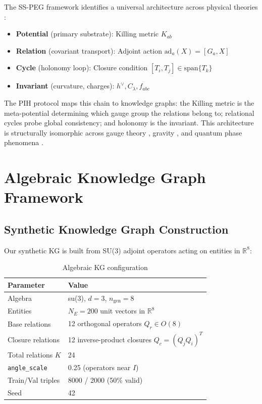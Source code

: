 \documentclass[11pt,letterpaper]{article}
\newcommand{\ad}{\text{ad}}
\newcommand{\hvee}{h^\vee}
\begin{document}
The SS-PEG framework identifies a universal architecture across physical theories \cite{sspeg_synthesis2026}:
\begin{itemize}[noitemsep]
\item \textbf{Potential} (primary substrate): Killing metric $K_{ab}$
\item \textbf{Relation} (covariant transport): Adjoint action $\ad_a(X) = [G_a, X]$
\item \textbf{Cycle} (holonomy loop): Closure condition $[T_i, T_j] \in \text{span}\{T_k\}$
\item \textbf{Invariant} (curvature, charges): $\hvee, C_\lambda, f_{abc}$
\end{itemize}
The PIH protocol maps this chain to knowledge graphs: the Killing metric is the meta-potential determining which gauge group the relations belong to; relational cycles probe global consistency; and holonomy is the invariant. This architecture is structurally isomorphic across gauge theory \cite{yang1954, georgi1982}, gravity \cite{jacobson1995, helgason2001}, and quantum phase phenomena \cite{aharonov1959, berry1984, fulton1991}.

\section{Algebraic Knowledge Graph Framework}

\subsection{Synthetic Knowledge Graph Construction}

Our synthetic KG is built from SU(3) adjoint operators acting on entities in $\mathbb{R}^8$:

\begin{table}[H]
\centering
\caption{Algebraic KG configuration}
\begin{tabular}{@{}ll@{}}
\toprule
\textbf{Parameter} & \textbf{Value} \\
\midrule
Algebra & su(3), $d=3$, $n_{\text{gen}} = 8$ \\
Entities & $N_E = 200$ unit vectors in $\mathbb{R}^8$ \\
Base relations & 12 orthogonal operators $Q_r \in O(8)$ \\
Closure relations & 12 inverse-product closures $Q_c = (Q_j Q_i)^T$ \\
Total relations $K$ & 24 \\
\texttt{angle\_scale} & 0.25 (operators near $I$) \\
Train/Val triples & 8000 / 2000 (50\% valid) \\
Seed & 42 \\
\bottomrule
\end{tabular}
\end{table}
\end{document}
